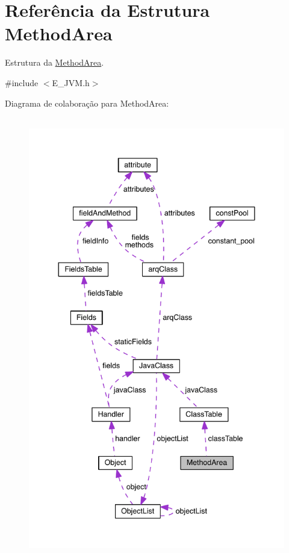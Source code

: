 \hypertarget{struct_method_area}{}\section{Referência da Estrutura Method\+Area}
\label{struct_method_area}


Estrutura da \hyperlink{struct_method_area}{Method\+Area}.  




{\ttfamily \#include $<$E\+\_\+\+J\+V\+M.\+h$>$}



Diagrama de colaboração para Method\+Area\+:\nopagebreak
\begin{figure}[H]
\begin{center}
\leavevmode
\includegraphics[height=550pt]{struct_method_area__coll__graph}
\end{center}
\end{figure}
